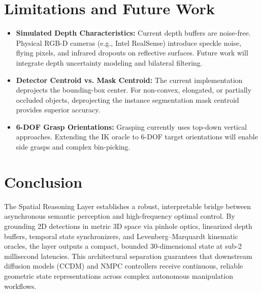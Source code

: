 \documentclass[10pt,a4paper]{article}
\begin{document}
\section{Limitations and Future Work}
\begin{itemize}
    \item \textbf{Simulated Depth Characteristics:} Current depth buffers are noise-free. Physical RGB-D cameras (e.g., Intel RealSense) introduce speckle noise, flying pixels, and infrared dropouts on reflective surfaces. Future work will integrate depth uncertainty modeling and bilateral filtering.
    \item \textbf{Detector Centroid vs. Mask Centroid:} The current implementation deprojects the bounding-box center. For non-convex, elongated, or partially occluded objects, deprojecting the instance segmentation mask centroid \cite{kirillov2023segment} provides superior accuracy.
    \item \textbf{6-DOF Grasp Orientations:} Grasping currently uses top-down vertical approaches. Extending the IK oracle to 6-DOF target orientations will enable side grasps and complex bin-picking.
\end{itemize}

\section{Conclusion}
The Spatial Reasoning Layer establishes a robust, interpretable bridge between asynchronous semantic perception and high-frequency optimal control. By grounding 2D detections in metric 3D space via pinhole optics, linearized depth buffers, temporal state synchronizers, and Levenberg--Marquardt kinematic oracles, the layer outputs a compact, bounded 30-dimensional state at sub-2 millisecond latencies. This architectural separation guarantees that downstream diffusion models (CCDM) and NMPC controllers receive continuous, reliable geometric state representations across complex autonomous manipulation workflows.

\newpage


\end{document}
